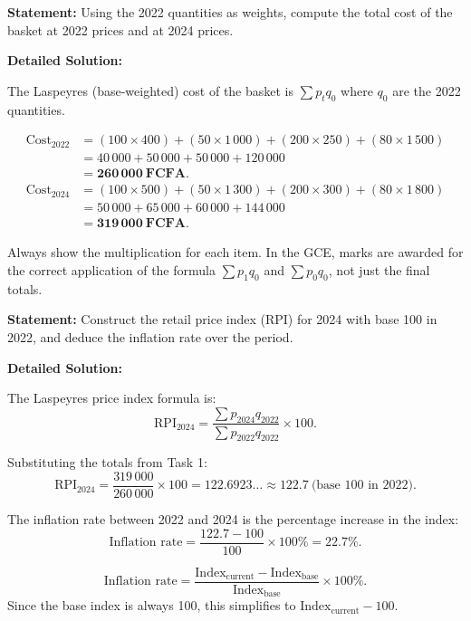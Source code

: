 \documentclass[11pt]{article}
\begin{document}
\begin{exoresolu}
\textbf{Statement:} Using the 2022 quantities as weights, compute the total cost of the basket at 2022 prices and at 2024 prices.

\tcblower
\textbf{Detailed Solution:}

The Laspeyres (base-weighted) cost of the basket is $\sum p_t q_0$ where $q_0$ are the 2022 quantities.

\begin{align*}
\text{Cost}_{2022} &= (100 \times 400) + (50 \times 1\,000) + (200 \times 250) + (80 \times 1\,500) \\
&= 40\,000 + 50\,000 + 50\,000 + 120\,000 \\
&= \mathbf{260\,000\ FCFA}. \\[6pt]
\text{Cost}_{2024} &= (100 \times 500) + (50 \times 1\,300) + (200 \times 300) + (80 \times 1\,800) \\
&= 50\,000 + 65\,000 + 60\,000 + 144\,000 \\
&= \mathbf{319\,000\ FCFA}.
\end{align*}

\begin{attention}
Always show the multiplication for each item. In the GCE, marks are awarded for the correct application of the formula $\sum p_1 q_0$ and $\sum p_0 q_0$, not just the final totals.
\end{attention}
\end{exoresolu}

\begin{exoresolu}
\textbf{Statement:} Construct the retail price index (RPI) for 2024 with base 100 in 2022, and deduce the inflation rate over the period.

\tcblower
\textbf{Detailed Solution:}

The Laspeyres price index formula is:
\[
\text{RPI}_{2024} = \frac{\sum p_{2024} q_{2022}}{\sum p_{2022} q_{2022}} \times 100.
\]

Substituting the totals from Task 1:
\[
\text{RPI}_{2024} = \frac{319\,000}{260\,000} \times 100 = 122.6923\ldots \approx \mathbf{122.7}\ \text{(base 100 in 2022)}.
\]

The inflation rate between 2022 and 2024 is the percentage increase in the index:
\[
\text{Inflation rate} = \frac{122.7 - 100}{100} \times 100\% = \mathbf{22.7\%}.
\]

\begin{aretenir}
\[
\text{Inflation rate} = \frac{\text{Index}_{\text{current}} - \text{Index}_{\text{base}}}{\text{Index}_{\text{base}}} \times 100\%.
\]
Since the base index is always 100, this simplifies to $\text{Index}_{\text{current}} - 100$.
\end{aretenir}
\end{exoresolu}
\end{document}
